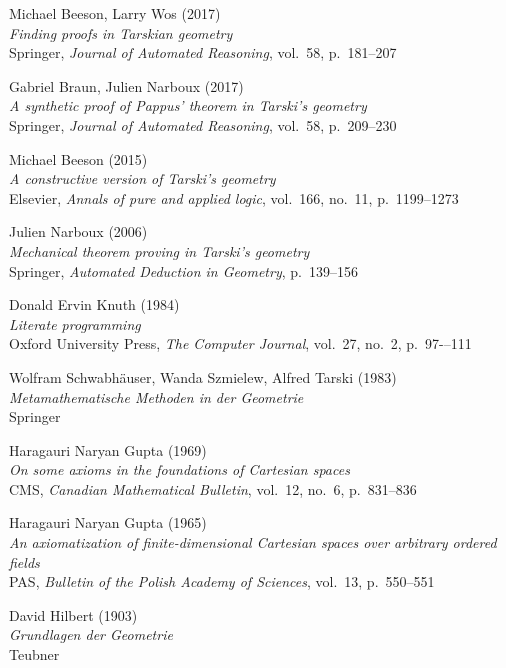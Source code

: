 \documentclass[10pt,a4paper,parskip=half,numbers=endperiod,parskip]{scrartcl}
\begin{document}
  Michael Beeson, Larry Wos (2017)
  \\ \textit{Finding proofs in Tarskian geometry}
  \\ Springer, \textit{Journal of Automated Reasoning}, vol.~58, p.~181--207

  Gabriel Braun, Julien Narboux (2017)
  \\ \textit{A synthetic proof of Pappus' theorem in Tarski's geometry}
  \\ Springer, \textit{Journal of Automated Reasoning}, vol.~58, p.~209--230

  Michael Beeson (2015)
  \\ \textit{A constructive version of Tarski's geometry}
  \\ Elsevier, \textit{Annals of pure and applied logic}, vol.~166, no.~11, p.~1199--1273

  Julien Narboux (2006)
  \\ \textit{Mechanical theorem proving in Tarski's geometry}
  \\ Springer, \textit{Automated Deduction in Geometry}, p.~139--156

  Donald Ervin Knuth (1984)
  \\ \textit{Literate programming}
  \\ Oxford University Press, \textit{The Computer Journal}, vol.~27, no.~2, p.~97-–111

  Wolfram Schwabhäuser, Wanda Szmielew, Alfred Tarski (1983)
  \\ \textit{Metamathematische Methoden in der Geometrie}
  \\ Springer

  Haragauri Naryan Gupta (1969)
  \\ \textit{On some axioms in the foundations of Cartesian spaces}
  \\ CMS,
  \textit{Canadian Mathematical Bulletin}, vol.~12, no.~6, p.~831--836

  Haragauri Naryan Gupta (1965)
  \\ \textit{An axiomatization of finite-dimensional Cartesian spaces over arbitrary ordered fields}
  \\ PAS,
  \textit{Bulletin of the Polish Academy of Sciences}, vol.~13, p.~550--551

  David Hilbert (1903)
  \\ \textit{Grundlagen der Geometrie}
  \\ Teubner
\end{document}
